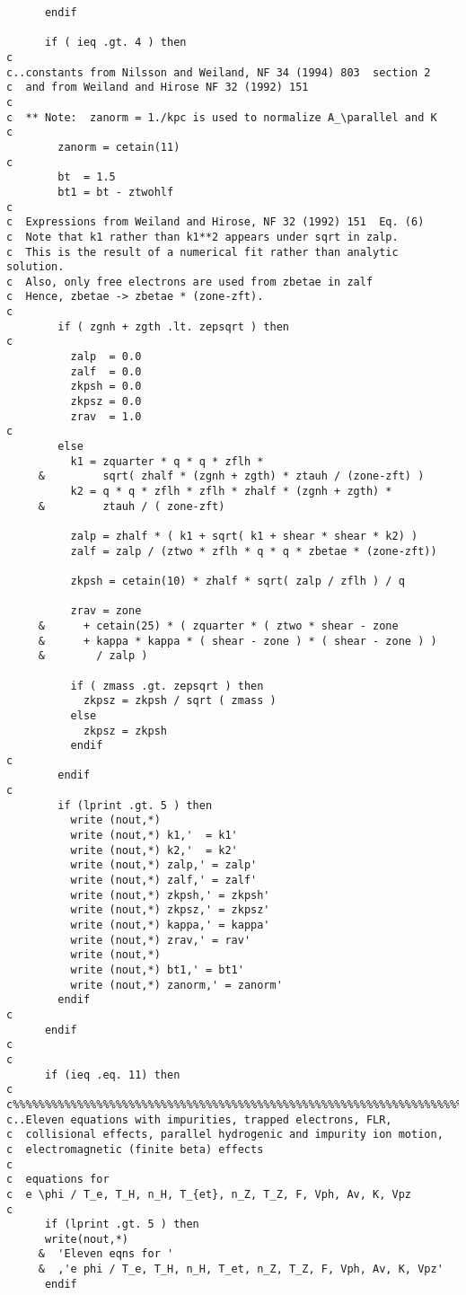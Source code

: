 \begin{verbatim}
      endif

      if ( ieq .gt. 4 ) then
c
c..constants from Nilsson and Weiland, NF 34 (1994) 803  section 2
c  and from Weiland and Hirose NF 32 (1992) 151
c
c  ** Note:  zanorm = 1./kpc is used to normalize A_\parallel and K
c
        zanorm = cetain(11)
c
        bt  = 1.5
        bt1 = bt - ztwohlf
c
c  Expressions from Weiland and Hirose, NF 32 (1992) 151  Eq. (6)
c  Note that k1 rather than k1**2 appears under sqrt in zalp.
c  This is the result of a numerical fit rather than analytic solution.
c  Also, only free electrons are used from zbetae in zalf
c  Hence, zbetae -> zbetae * (zone-zft).
c
        if ( zgnh + zgth .lt. zepsqrt ) then
c
          zalp  = 0.0
          zalf  = 0.0
          zkpsh = 0.0
          zkpsz = 0.0
          zrav  = 1.0
c
        else
          k1 = zquarter * q * q * zflh *
     &         sqrt( zhalf * (zgnh + zgth) * ztauh / (zone-zft) )
          k2 = q * q * zflh * zflh * zhalf * (zgnh + zgth) *
     &         ztauh / ( zone-zft)

          zalp = zhalf * ( k1 + sqrt( k1 + shear * shear * k2) )
          zalf = zalp / (ztwo * zflh * q * q * zbetae * (zone-zft))

          zkpsh = cetain(10) * zhalf * sqrt( zalp / zflh ) / q

          zrav = zone
     &      + cetain(25) * ( zquarter * ( ztwo * shear - zone
     &      + kappa * kappa * ( shear - zone ) * ( shear - zone ) )
     &        / zalp )

          if ( zmass .gt. zepsqrt ) then
            zkpsz = zkpsh / sqrt ( zmass )
          else
            zkpsz = zkpsh
          endif
c
        endif
c
        if (lprint .gt. 5 ) then
          write (nout,*)
          write (nout,*) k1,'  = k1'
          write (nout,*) k2,'  = k2'
          write (nout,*) zalp,' = zalp'
          write (nout,*) zalf,' = zalf'
          write (nout,*) zkpsh,' = zkpsh'
          write (nout,*) zkpsz,' = zkpsz'
          write (nout,*) kappa,' = kappa'
          write (nout,*) zrav,' = rav'
          write (nout,*)
          write (nout,*) bt1,' = bt1'
          write (nout,*) zanorm,' = zanorm'
        endif
c
      endif
c
c
      if (ieq .eq. 11) then
c
c%%%%%%%%%%%%%%%%%%%%%%%%%%%%%%%%%%%%%%%%%%%%%%%%%%%%%%%%%%%%%%%%%%%%%%%%%%
c..Eleven equations with impurities, trapped electrons, FLR,
c  collisional effects, parallel hydrogenic and impurity ion motion,
c  electromagnetic (finite beta) effects
c
c  equations for
c  e \phi / T_e, T_H, n_H, T_{et}, n_Z, T_Z, F, Vph, Av, K, Vpz
c
      if (lprint .gt. 5 ) then
      write(nout,*)
     &  'Eleven eqns for '
     &  ,'e phi / T_e, T_H, n_H, T_et, n_Z, T_Z, F, Vph, Av, K, Vpz'
      endif


\end{verbatim}
